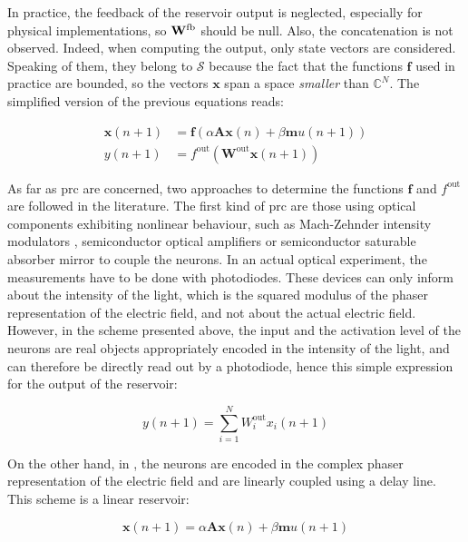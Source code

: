In practice, the feedback of the reservoir output is neglected, especially for physical implementations, so $\mathbf{W}^{\text{fb}}$ should be null. Also, the concatenation is not observed. Indeed, when computing the output, only state vectors are considered. Speaking of them, they belong to $\mathcal{S}$ because the fact that the functions $\mathbf{f}$ used in practice are bounded, so the vectors $\mathbf{x}$ span a space \textit{smaller} than $\mathbb{C}^N$. The simplified version of the previous equations reads:

\begin{align}
	\mathbf{x}(n+1) &= \mathbf{f} \left( \alpha \mathbf{A} \mathbf{x}(n) + \beta \mathbf{m} u(n+1) \right)\\
	y(n+1) &= f^{\text{out}} \left( \mathbf{W}^{\text{out}} \mathbf{x}(n+1) \right)
\end{align}

As far as \gls{prc} are concerned, two approaches to determine the functions $\mathbf{f}$ and $f^{\text{out}}$ are followed in the literature. The first kind of \gls{prc} are those using optical components exhibiting nonlinear behaviour, such as Mach-Zehnder intensity modulators \cite{Duport2016, Paquot2012, Antonik2017}, semiconductor optical amplifiers \cite{Vandoorne2008} or semiconductor saturable absorber mirror \cite{Dejonckheere2014} to couple the neurons. In an actual optical experiment, the measurements have to be done with photodiodes. These devices can only inform about the intensity of the light, which is the squared modulus of the phaser representation of the electric field, and not about the actual electric field. However, in the scheme presented above, the input and the activation level of the neurons are real objects appropriately encoded in the intensity of the light, and can therefore be directly read out by a photodiode, hence this simple expression for the output of the reservoir:

\begin{equation}
	y(n+1) = \sum_{i=1}^{N} W^{\text{out}}_i x_i (n+1)
	\label{lin_output_rc}
\end{equation}

On the other hand, in \cite{Vinckier2015}, the neurons are encoded in the complex phaser representation of the electric field and are linearly coupled using a delay line. This scheme is a linear reservoir:

\begin{equation}
	\mathbf{x}(n+1) = \alpha \mathbf{A} \mathbf{x}(n) + \beta \mathbf{m} u(n+1)
	\label{rc_lin_dynamics}
\end{equation}

